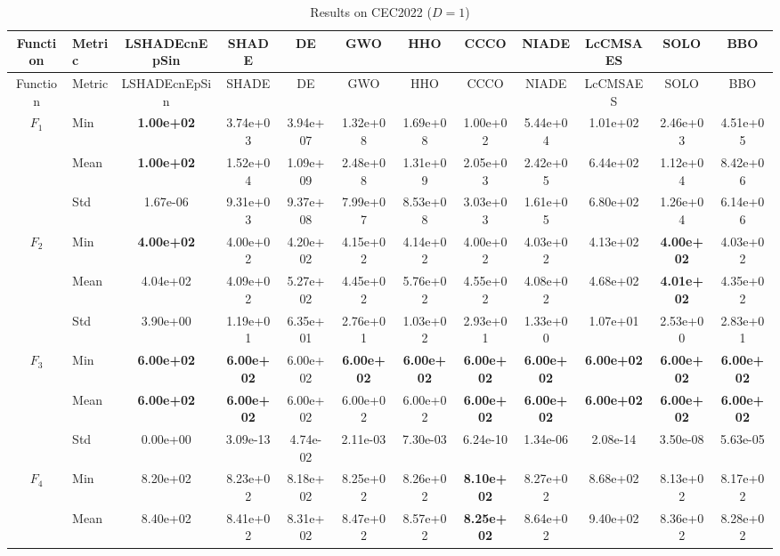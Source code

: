 \begin{center}
\small
\renewcommand{\arraystretch}{1.25}
\begin{longtable}{clcccccccccc}
\caption{Results on CEC2022 ($D=1$) }
\label{tab:results_CEC2022_1} \\
\toprule
Function & Metric & LSHADEcnEpSin & SHADE & DE & GWO & HHO & CCCO & NIADE & LcCMSAES & SOLO & BBO \\
\midrule
\endfirsthead
\toprule
Function & Metric & LSHADEcnEpSin & SHADE & DE & GWO & HHO & CCCO & NIADE & LcCMSAES & SOLO & BBO \\
\midrule
\endhead
\multirow{3}{*}{$F_{1}$} & Min & \textbf{1.00e+02} & 3.74e+03 & 3.94e+07 & 1.32e+08 & 1.69e+08 & 1.00e+02 & 5.44e+04 & 1.01e+02 & 2.46e+03 & 4.51e+05 \\
 & Mean & \textbf{1.00e+02} & 1.52e+04 & 1.09e+09 & 2.48e+08 & 1.31e+09 & 2.05e+03 & 2.42e+05 & 6.44e+02 & 1.12e+04 & 8.42e+06 \\
 & Std & 1.67e-06 & 9.31e+03 & 9.37e+08 & 7.99e+07 & 8.53e+08 & 3.03e+03 & 1.61e+05 & 6.80e+02 & 1.26e+04 & 6.14e+06 \\
\midrule
\multirow{3}{*}{$F_{2}$} & Min & \textbf{4.00e+02} & 4.00e+02 & 4.20e+02 & 4.15e+02 & 4.14e+02 & 4.00e+02 & 4.03e+02 & 4.13e+02 & \textbf{4.00e+02} & 4.03e+02 \\
 & Mean & 4.04e+02 & 4.09e+02 & 5.27e+02 & 4.45e+02 & 5.76e+02 & 4.55e+02 & 4.08e+02 & 4.68e+02 & \textbf{4.01e+02} & 4.35e+02 \\
 & Std & 3.90e+00 & 1.19e+01 & 6.35e+01 & 2.76e+01 & 1.03e+02 & 2.93e+01 & 1.33e+00 & 1.07e+01 & 2.53e+00 & 2.83e+01 \\
\midrule
\multirow{3}{*}{$F_{3}$} & Min & \textbf{6.00e+02} & \textbf{6.00e+02} & 6.00e+02 & \textbf{6.00e+02} & \textbf{6.00e+02} & \textbf{6.00e+02} & \textbf{6.00e+02} & \textbf{6.00e+02} & \textbf{6.00e+02} & \textbf{6.00e+02} \\
 & Mean & \textbf{6.00e+02} & \textbf{6.00e+02} & 6.00e+02 & 6.00e+02 & 6.00e+02 & \textbf{6.00e+02} & \textbf{6.00e+02} & \textbf{6.00e+02} & \textbf{6.00e+02} & \textbf{6.00e+02} \\
 & Std & 0.00e+00 & 3.09e-13 & 4.74e-02 & 2.11e-03 & 7.30e-03 & 6.24e-10 & 1.34e-06 & 2.08e-14 & 3.50e-08 & 5.63e-05 \\
\midrule
\multirow{3}{*}{$F_{4}$} & Min & 8.20e+02 & 8.23e+02 & 8.18e+02 & 8.25e+02 & 8.26e+02 & \textbf{8.10e+02} & 8.27e+02 & 8.68e+02 & 8.13e+02 & 8.17e+02 \\
 & Mean & 8.40e+02 & 8.41e+02 & 8.31e+02 & 8.47e+02 & 8.57e+02 & \textbf{8.25e+02} & 8.64e+02 & 9.40e+02 & 8.36e+02 & 8.28e+02 \\

\end{longtable}
\end{center}
